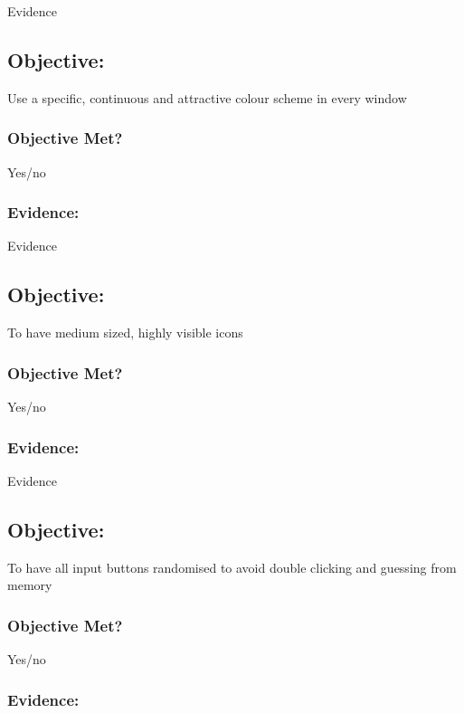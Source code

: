 Evidence

\subsection{Objective: }

Use a specific, continuous and attractive colour scheme in every window

\subsubsection{Objective Met?}

Yes/no 

\subsubsection{Evidence: }

Evidence

\subsection{Objective: }

To have medium sized, highly visible icons

\subsubsection{Objective Met?}

Yes/no 

\subsubsection{Evidence: }

Evidence

\subsection{Objective: }

To have all input buttons randomised to avoid double clicking and guessing from memory

\subsubsection{Objective Met?}

Yes/no 

\subsubsection{Evidence: }

